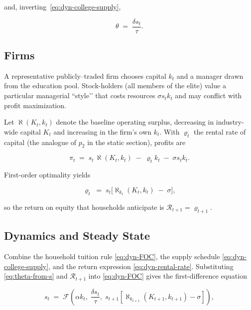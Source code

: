 \documentclass[12pt,letterpaper]{article}
\begin{document}
and, inverting~\eqref{eq:dyn-college-supply},

\begin{equation}\label{eq:theta-from-s}
	\theta \;=\; \frac{\delta s_t}{\tau}.
\end{equation}

\subsection{Firms}\label{subsec:dyn-firms}

A representative publicly–traded firm chooses capital $k_t$ and
a manager drawn from the education pool.
Stock-holders (all members of the elite) value a particular managerial “style’’
that costs resources $\sigma s_t k_t$ and may conflict with profit maximization.

Let $\aleph(K_t,k_t)$ denote the baseline operating surplus, decreasing in
industry-wide capital $K_t$ and increasing in the firm’s own $k_t$.
With $\varrho_t$ the rental rate of capital (the analogue of $p_2$ in the static section),
profits are

\begin{equation}\label{eq:dyn-firm-profit}
	\pi_t
	\;=\;
	s_t\,\aleph(K_t,k_t)\;-\;\varrho_t k_t\;-\;\sigma s_t k_t .
\end{equation}

First-order optimality yields

\begin{equation}\label{eq:dyn-rental-rate}
	\varrho_t \;=\; s_t\bigl[\aleph_{k_t}(K_t,k_t)\;-\;\sigma\bigr],
\end{equation}

so the return on equity that households anticipate is
$\mathcal{R}_{t+1}=\varrho_{t+1}$.

\subsection{Dynamics and Steady State}\label{subsec:dyn-dynamics}

Combine the household tuition rule \eqref{eq:dyn-FOC},
the supply schedule \eqref{eq:dyn-college-supply},
and the return expression \eqref{eq:dyn-rental-rate}.  Substituting
\eqref{eq:theta-from-s} and $\mathcal{R}_{t+1}$ into \eqref{eq:dyn-FOC} gives the
first-difference equation

\begin{equation}\label{eq:dyn-map}
	s_t \;=\;
	\mathcal{F}\!\!\left(\alpha k_t,\;
	\frac{\delta s_t}{\tau},\;
	s_{t+1}\!\left[\aleph_{k_{t+1}}(K_{t+1},k_{t+1})-\sigma\right]\right),
\end{equation}
\end{document}
